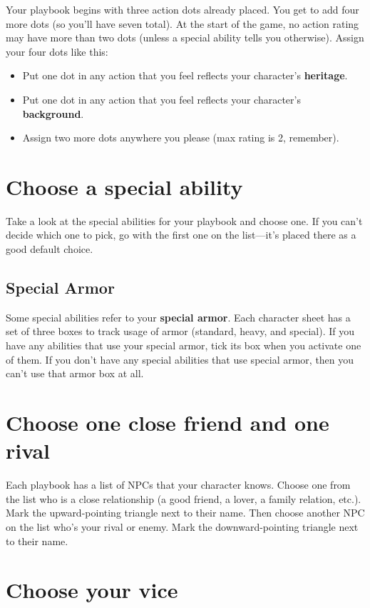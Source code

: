 \documentclass[11pt,oneside]{book}
\begin{document}
Your playbook begins with three action dots already placed. You get to add four more dots (so you’ll have seven total). At the start of the game, no action rating may have more than two dots (unless a special ability tells you otherwise). Assign your four dots like this:

\begin{itemize}
	\item Put one dot in any action that you feel reflects your character’s \textbf{heritage}.
	\item Put one dot in any action that you feel reflects your character’s \textbf{background}.
	\item Assign two more dots anywhere you please (max rating is 2, remember).
\end{itemize}

\section{Choose a special ability}

Take a look at the special abilities for your playbook and choose one. If you can’t decide which one to pick, go with the first one on the list---it’s placed there as a good default choice.

\subsection{Special Armor}

Some special abilities refer to your \textbf{special armor}. Each character sheet has a set of three boxes to track usage of armor (standard, heavy, and special). If you have any abilities that use your special armor, tick its box when you activate one of them. If you don’t have any special abilities that use special armor, then you can’t use that armor box at all.

\section{Choose one close friend and one rival}

Each playbook has a list of NPCs that your character knows. Choose one from the list who is a close relationship (a good friend, a lover, a family relation, etc.). Mark the upward-pointing triangle next to their name. Then choose another NPC on the list who’s your rival or enemy. Mark the downward-pointing triangle next to their name.

\section{Choose your vice}
\end{document}
